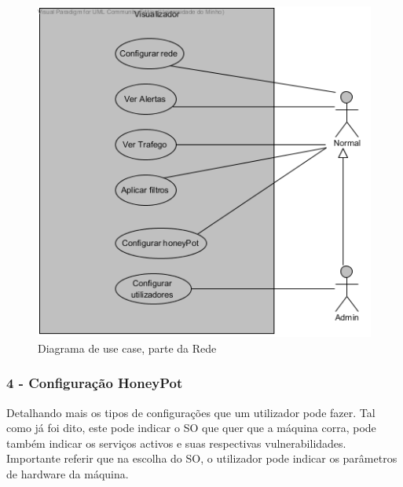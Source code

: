 \begin{figure}[!htb]
	\centering
	\includegraphics[scale=0.80]{images/ucs/Visualizador}
	\caption {Diagrama de use case, parte da Rede}
\end{figure}
\pagebreak






\subsubsection{\textbf{4 - Configuração HoneyPot}}

Detalhando mais os tipos de configurações que um utilizador pode fazer. Tal como já foi dito, este pode indicar o SO que quer que a máquina corra, 
pode também indicar os serviços activos e suas respectivas vulnerabilidades. Importante referir que na escolha do SO, o utilizador pode indicar os 
parâmetros de hardware da máquina.

